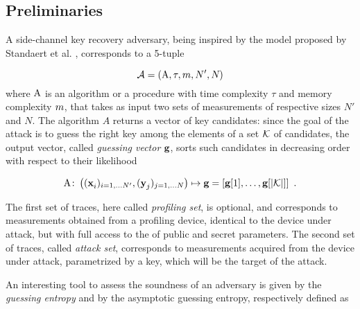 \subsection{Preliminaries}

A side-channel key recovery adversary, being inspired by the model proposed by Standaert et al. \cite{unifiedFramework}, corresponds to a 5-tuple 

\begin{equation}
\adversary = (\attackAlgorithm, \tau, \memComplexity , \numTraces[]', \numTraces[]) \mbox{}
\end{equation}
where $\attackAlgorithm$ is an algorithm or a procedure with time complexity $\tau$ and memory complexity $\memComplexity$, that takes as input two sets of measurements of respective sizes $N'$ and $N$. The algorithm $A$ returns a vector of key candidates: since the goal of the attack is to guess the right key among the elements of a set  $\keySet$  of candidates, the output vector, called {\em guessing vector} $\guessingVector$, sorts such candidates in decreasing order with respect to their likelihood

\begin{equation}
\attackAlgorithm \colon \left( (\sss[]{i})_{i=1,\dots \numTraces[]'}, (\sssTest[]{j})_{j=1,\dots \numTraces[]} \right) \mapsto \guessingVector = \left[\guessingVector[1], \dots, \guessingVector[{\lvert \keySet \rvert}]\right] \mbox{ .}
\end{equation}


The first set of traces, here called {\em profiling set}, is optional, and corresponds to measurements obtained from a profiling device, identical to the device under attack, but with full access to the of public and secret parameters. The second set of traces,  called {\em attack set}, corresponds to measurements acquired from the device under attack, parametrized by a key, which will be the target of the attack.

An interesting tool to assess the soundness of an adversary is given by the {\em guessing entropy} \cite{massey1994guessing} and by the {asymptotic guessing entropy}, respectively defined as

